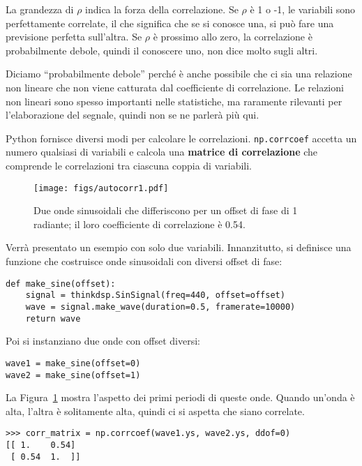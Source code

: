 \documentclass[12pt]{book} \usepackage[width=5.5in,height=8.5in, hmarginratio=3:2,vmarginratio=1:1]{geometry}
\begin{document}
La grandezza di $\rho$ indica la forza della correlazione. Se $\rho$ è 1 o -1, le variabili sono perfettamente correlate, il che significa che se si conosce una, si può fare una previsione perfetta sull'altra. Se $\rho$ è prossimo allo zero, la correlazione è probabilmente debole, quindi il conoscere uno, non dice molto sugli altri.

Diciamo ``probabilmente debole'' perché è anche possibile che ci sia una relazione non lineare che non viene catturata dal coefficiente di correlazione. Le relazioni non lineari sono spesso importanti nelle statistiche, ma raramente rilevanti per l'elaborazione del segnale, quindi non se ne parlerà più qui.

Python fornisce diversi modi per calcolare le correlazioni. {\tt np.corrcoef} accetta un numero qualsiasi di variabili e calcola una {\bf matrice di correlazione} che comprende le correlazioni tra ciascuna coppia di variabili.

\begin{figure} 

\centerline{\texttt{[image: figs/autocorr1.pdf]}} \caption{Due onde sinusoidali che differiscono per un offset di fase di 1 radiante; il loro coefficiente di correlazione è 0.54.} \label{fig.autocorr1} \end{figure} 

Verrà presentato un esempio con solo due variabili. Innanzitutto, si definisce una funzione che costruisce onde sinusoidali con diversi offset di fase:

\begin{verbatim} 
def make_sine(offset):
    signal = thinkdsp.SinSignal(freq=440, offset=offset)
    wave = signal.make_wave(duration=0.5, framerate=10000)
    return wave
 \end{verbatim} 

Poi si instanziano due onde con offset diversi:

\begin{verbatim} 
wave1 = make_sine(offset=0)
wave2 = make_sine(offset=1)
 \end{verbatim} 

La Figura~\ref{fig.autocorr1} mostra l'aspetto dei primi periodi di queste onde. Quando un'onda è alta, l'altra è solitamente alta, quindi ci si aspetta che siano correlate.

\begin{verbatim} 
>>> corr_matrix = np.corrcoef(wave1.ys, wave2.ys, ddof=0)
[[ 1.    0.54]
 [ 0.54  1.  ]]
 \end{verbatim} 
\end{document}
